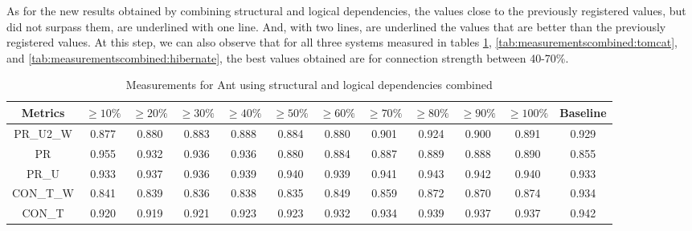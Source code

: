 \documentclass[runningheads]{comsis2}
\begin{document}
As for the new results obtained by combining structural and logical dependencies, the values close to the previously registered values, but did not surpass them, are underlined with one line. And, with two lines, are underlined the values that are better than the previously registered values. At this step, we can also observe that for all three systems measured in tables \ref{tab:measurementscombined:ant}, \ref{tab:measurementscombined:tomcat}, and \ref{tab:measurementscombined:hibernate}, the best values obtained are for connection strength between 40-70\%.

\begin{table}[!h]
\renewcommand{\arraystretch}{1}
\caption{Measurements for Ant using structural and logical dependencies combined}
\label{tab:measurementscombined:ant}
\centering
\begin{tabular}{|c|cccccccccc|c|}
\hline
Metrics &	$\geq10\%$	&	$\geq20\%$		&	$\geq30\%$		&	$\geq40\%$		&	$\geq50\%$		&	$\geq60\%$		&	$\geq70\%$		&	$\geq80\%$		&	$\geq90\%$		&	$\geq100\%$		&	Baseline \\
\hline

PR\_U2\_W	&	0.877	&	0.880	&	0.883	&	0.888	&	0.884	&	0.880	&	0.901	&	0.924	&	0.900	&	0.891	&	0.929	\\
PR	&	0.955	&	0.932	&	0.936	&	0.936	&	0.880	&	0.884	&	0.887	&	0.889	&	0.888	&	0.890	&	0.855	\\
PR\_U	&	0.933	&	0.937	&	0.936	&	0.939	&	0.940	&	0.939	&	0.941	&	0.943	&	0.942	&	0.940	&	0.933	\\
CON\_T\_W	&	0.841	&	0.839	&	0.836	&	0.838	&	0.835	&	0.849	&	0.859	&	0.872	&	0.870	&	0.874	&	0.934	\\
CON\_T	&	0.920	&	0.919	&	0.921	&	0.923	&	0.923	&	0.932	&	0.934	&	0.939	&	0.937	&	0.937	&	0.942	\\

\hline
\end{tabular}
\end{table}
\end{document}
